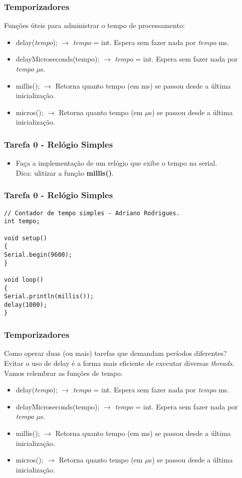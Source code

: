 \documentclass{beamer}
\begin{document}
\begin{frame}
	\frametitle{Temporizadores}
	Funções úteis para administrar o tempo de processamento:
	\begin{itemize}
	\item delay(\textit{tempo}); $\rightarrow$ \textit{tempo} = int. Espera sem fazer nada por \textit{tempo} ms.
	\item delayMicroseconds(tempo); $\rightarrow$ \textit{tempo} = int. Espera sem fazer nada por \textit{tempo} $\mu$s.
	\item millis(); $\rightarrow$ Retorna quanto tempo (em ms) se passou desde a última inicialização.
	\item micros(); $\rightarrow$ Retorna quanto tempo (em $\mu$s) se passou desde a última inicialização.
	\end{itemize}
\end{frame}

\begin{frame}
	\frametitle{Tarefa 0 - Relógio Simples}
	\begin{itemize}
	\item Faça a implementaç\~ao de um rel\'ogio que exibe o tempo na serial.\\[5pt] Dica: ulitizar a função \textbf{millis()}.
	\end{itemize}
\end{frame}

\begin{frame}[fragile]
	\frametitle{Tarefa 0 - Relógio Simples}
	\begin{lstlisting}[style=Arduino,basicstyle=\scriptsize \ttfamily]
// Contador de tempo simples - Adriano Rodrigues.
int tempo;

void setup()
{
Serial.begin(9600);
}

void loop()
{
Serial.println(millis());
delay(1000);
}
	\end{lstlisting}
\end{frame}

\begin{frame}
	\frametitle{Temporizadores}
	Como operar duas (ou mais) tarefas que demandam per\'iodos diferentes?\\[5pt]
	Evitar o uso de delay é a forma mais eficiente de executar diversas \textit{threads}. Vamos relembrar as funções de tempo. \\[5pt]
	\begin{itemize}
	\item delay(\textit{tempo}); $\rightarrow$ \textit{tempo} = int. Espera sem fazer nada por \textit{tempo} ms.
	\item delayMicroseconds(tempo); $\rightarrow$ \textit{tempo} = int. Espera sem fazer nada por \textit{tempo} $\mu$s.
	\item millis(); $\rightarrow$ Retorna quanto tempo (em ms) se passou desde a última inicialização.
	\item micros(); $\rightarrow$ Retorna quanto tempo (em $\mu$s) se passou desde a última inicialização.
	\end{itemize}
\end{frame}
\end{document}

